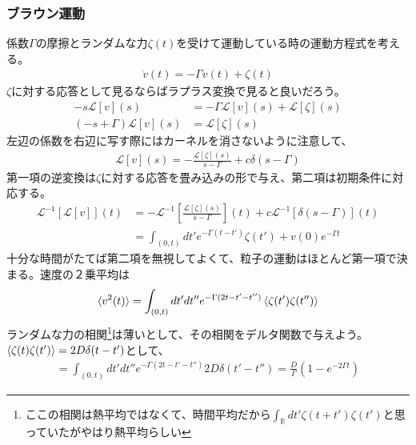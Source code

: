 \documentclass[autodetect-engine,dvipdfmx-if-dvi,ja=standard]{bxjsarticle}
\theoremstyle{break}
\begin{document}
            \subsubsection{ブラウン運動}
                係数$\Gamma$の摩擦とランダムな力$\zeta(t)$を受けて運動している時の運動方程式を考える。
                \begin{align}
                    \dot{v}(t)=-\Gamma v(t)+\zeta(t)
                \end{align}
                $\zeta$に対する応答として見るならばラプラス変換で見ると良いだろう。
                \begin{align}
                    -s\mathcal{L}[v](s)&=-\Gamma \mathcal{L}[v](s)+\mathcal{L}[\zeta](s)\\
                    (-s+\Gamma)\mathcal{L}[v](s)&=\mathcal{L}[\zeta](s)
                \end{align}
                左辺の係数を右辺に写す際にはカーネルを消さないように注意して、
                \begin{align}
                    \mathcal{L}[v](s)=-\frac{\mathcal{L}[\zeta](s)}{s-\Gamma}+c\delta(s-\Gamma)
                \end{align}
                第一項の逆変換は$\zeta$に対する応答を畳み込みの形で与え、第二項は初期条件に対応する。
                \begin{align}
                    \mathcal{L}^{-1}[\mathcal{L}[v]](t)&=-\mathcal{L}^{-1}\left[\frac{\mathcal{L}[\zeta](s)}{s-\Gamma}\right](t)+c\mathcal{L}^{-1}[\delta(s-\Gamma)](t)\\
                    &=\int_{(0,t)}dt'e^{-\Gamma(t-t')}\zeta (t')+v(0)e^{-\Gamma t}
                \end{align}
                十分な時間がたてば第二項を無視してよくて、粒子の運動はほとんど第一項で決まる。速度の２乗平均は
                \begin{align}
                    \braket{v^2(t)}=\int_{(0,t)}dt'dt'' e^{-\Gamma(2t-t'-t'')}\braket{\zeta (t')\zeta (t'')}
                \end{align}
                ランダムな力の相関\footnote{ここの相関は熱平均ではなくて、時間平均だから$\int_{\mathbb{R}} dt' \zeta(t+t')\zeta(t')$と思っていたがやはり熱平均らしい}は薄いとして、その相関をデルタ関数で与えよう。$\braket{\zeta(t)\zeta(t')}=2D\delta(t-t')$として、
                \begin{align}
                    =\int_{(0,t)}dt'dt'' e^{-\Gamma(2t-t'-t'')}2D\delta(t'-t'')=\frac{D}{\Gamma}(1-e^{-2\Gamma t})
                \end{align}
\end{document}

